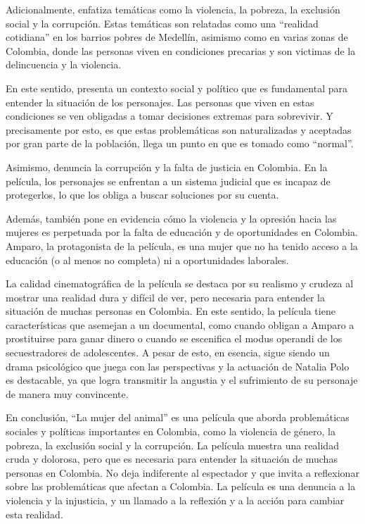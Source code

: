 \documentclass[letterpaper, 12pt]{report}
\begin{document}
Adicionalmente, enfatiza temáticas como la violencia, la
pobreza, la exclusión social y la corrupción. Estas
temáticas son relatadas como una ``realidad cotidiana'' en
los barrios pobres de Medellín, asimismo como en varias
zonas de Colombia, donde las personas viven en condiciones
precarias y son victimas de la delincuencia y la violencia.

En este sentido, presenta un contexto social y político que
es fundamental para entender la situación de los
personajes. Las personas que viven en estas condiciones se
ven obligadas a tomar decisiones extremas para sobrevivir.
Y precisamente por esto, es que estas problemáticas son
naturalizadas y aceptadas por gran parte de la población,
llega un punto en que es tomado como ``normal''.

Asimismo, denuncia la corrupción y la falta de justicia en
Colombia. En la película, los personajes se enfrentan a un
sistema judicial que es incapaz de protegerlos, lo que los
obliga a buscar soluciones por su cuenta.

Además, también pone en evidencia cómo la violencia y la
opresión hacia las mujeres es perpetuada por la falta de
educación y de oportunidades en Colombia. Amparo, la
protagonista de la película, es una mujer que no ha tenido
acceso a la educación (o al menos no completa) ni a
oportunidades laborales.

La calidad cinematográfica de la película se destaca por su
realismo y crudeza al mostrar una realidad dura y difícil
de ver, pero necesaria para entender la situación de muchas
personas en Colombia. En este sentido, la película tiene
características que asemejan a un documental, como cuando
obligan a Amparo a prostituirse para ganar dinero o cuando
se escenifica el modus operandi de los secuestradores de
adolescentes. A pesar de esto, en esencia, sigue siendo un
drama psicológico que juega con las perspectivas y la
actuación de Natalia Polo es destacable, ya que logra
transmitir la angustia y el sufrimiento de su personaje de
manera muy convincente.

En conclusión, ``La mujer del animal'' es una película que
aborda problemáticas sociales y políticas importantes en
Colombia, como la violencia de género, la pobreza, la
exclusión social y la corrupción. La película muestra una
realidad cruda y dolorosa, pero que es necesaria para
entender la situación de muchas personas en Colombia. No
deja indiferente al espectador y que invita a reflexionar
sobre las problemáticas que afectan a
Colombia. La película es una denuncia a la violencia y la
injusticia, y un llamado a la reflexión y a la
acción para cambiar esta realidad.

\newpage

\printbibliography
\end{document}
